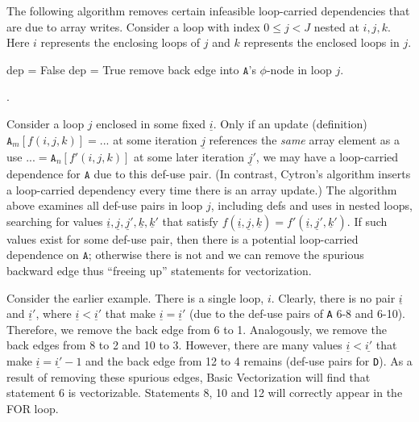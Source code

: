 \documentclass[sigconf, screen, natbib=false, dvipsnames, table]{acmart}
\theoremstyle{definition}
\begin{document}
The following algorithm removes certain infeasible loop-carried dependencies that are due to array writes. Consider a loop with index $0 \le j < J$
nested at $i,j,k$. Here $i$ represents the enclosing loops of $j$ and $k$ represents the enclosed loops in $j$.

\begin{algorithmic}
\STATE {}
\STATE dep = False
\STATE dep = True
\ENDIF
\ENDFOR
{}
\STATE remove back edge into $\texttt{A}$'s $\phi$-node in loop $j$.
\ENDIF
\ENDFOR
\end{algorithmic}

.

Consider a loop $j$ enclosed in some fixed $\underline{i}$. Only if an update (definition) $\texttt{A}_m[f(i,j,k)] = ... $ at some iteration $\underline{j}$
references the \emph{same} array element as a use $ ... = \texttt{A}_n[f'(i,j,k)]$ at some later iteration $\underline{j}'$,
we may have a loop-carried dependence for $\texttt{A}$ due to this def-use pair. (In contrast, Cytron's algorithm inserts a loop-carried dependency every time there is an array update.)
The algorithm above examines all def-use pairs in loop $j$, including defs and uses in nested loops, searching for values $\underline{i}, \underline{j}, \underline{j}', \underline{k}, \underline{k}'$ that satisfy
$f(\underline{i},\underline{j},\underline{k}) = f'(\underline{i},\underline{j}',\underline{k}')$. If such values exist for some def-use pair, then there is a potential
loop-carried dependence on $\texttt{A}$; otherwise there is not and we can remove the spurious backward edge thus ``freeing up'' statements for vectorization. %

Consider the earlier example. There is a single loop, $i$. Clearly, there is no pair $\underline{i}$ and $\underline{i}'$, where $\underline{i} < \underline{i}'$ that make $\underline{i} = \underline{i}'$ (due to the def-use pairs of \texttt{A} 6-8 and 6-10).
Therefore, we remove the back edge from 6 to 1. Analogously, we remove the back edges from 8 to 2 and 10 to 3. However, there are many values $\underline{i} < \underline{i'}$ that make $\underline{i} = \underline{i'}-1$ and the back edge from 12 to 4 remains (def-use pairs for \texttt{D}). As a result of removing these spurious edges, Basic Vectorization will find that statement 6 is vectorizable. Statements 8, 10 and 12 will correctly appear in the FOR loop.
\end{document}
